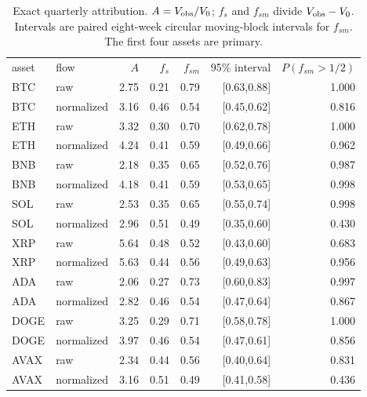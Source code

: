 \begin{table}[!htbp]
\caption{Exact quarterly attribution. $A=V_{\rm obs}/V_0$; $f_s$ and $f_{sm}$ divide $V_{\rm obs}-V_0$. Intervals are paired eight-week circular moving-block intervals for $f_{sm}$. The first four assets are primary.}
\label{tab:exact-attribution}
\begin{ruledtabular}
\begin{tabular}{llrrrrr}
asset & flow & $A$ & $f_s$ & $f_{sm}$ & 95\% interval & $P(f_{sm}>1/2)$ \\
\colrule
BTC & raw & 2.75 & 0.21 & 0.79 & [0.63,0.88] & 1.000 \\
BTC & normalized & 3.16 & 0.46 & 0.54 & [0.45,0.62] & 0.816 \\
ETH & raw & 3.32 & 0.30 & 0.70 & [0.62,0.78] & 1.000 \\
ETH & normalized & 4.24 & 0.41 & 0.59 & [0.49,0.66] & 0.962 \\
BNB & raw & 2.18 & 0.35 & 0.65 & [0.52,0.76] & 0.987 \\
BNB & normalized & 4.18 & 0.41 & 0.59 & [0.53,0.65] & 0.998 \\
SOL & raw & 2.53 & 0.35 & 0.65 & [0.55,0.74] & 0.998 \\
SOL & normalized & 2.96 & 0.51 & 0.49 & [0.35,0.60] & 0.430 \\
\colrule
XRP & raw & 5.64 & 0.48 & 0.52 & [0.43,0.60] & 0.683 \\
XRP & normalized & 5.63 & 0.44 & 0.56 & [0.49,0.63] & 0.956 \\
ADA & raw & 2.06 & 0.27 & 0.73 & [0.60,0.83] & 0.997 \\
ADA & normalized & 2.82 & 0.46 & 0.54 & [0.47,0.64] & 0.867 \\
DOGE & raw & 3.25 & 0.29 & 0.71 & [0.58,0.78] & 1.000 \\
DOGE & normalized & 3.97 & 0.46 & 0.54 & [0.47,0.61] & 0.856 \\
AVAX & raw & 2.34 & 0.44 & 0.56 & [0.40,0.64] & 0.831 \\
AVAX & normalized & 3.16 & 0.51 & 0.49 & [0.41,0.58] & 0.436 \\
\end{tabular}
\end{ruledtabular}
\end{table}

